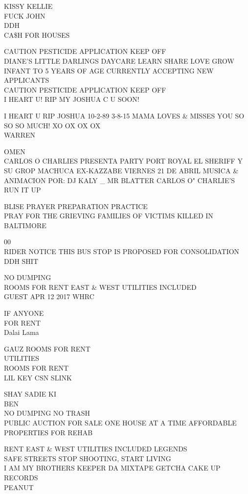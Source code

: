 \documentclass[10pt,letterpaper]{article}
\begin{document}
KISSY KELLIE\\
FUCK JOHN\\
DDH\\
CA\$H FOR HOUSES

CAUTION PESTICIDE APPLICATION KEEP OFF\\
DIANE'S LITTLE DARLINGS DAYCARE LEARN SHARE LOVE GROW INFANT TO 5 YEARS OF AGE CURRENTLY ACCEPTING NEW APPLICANTS\\
CAUTION PESTICIDE APPLICATION KEEP OFF\\
I HEART U!  RIP MY JOSHUA C U SOON!

I HEART U RIP JOSHUA 10{-}2{-}89 3{-}8{-}15 MAMA LOVES \& MISSES YOU SO SO SO MUCH! XO OX OX OX\\
WARREN

OMEN\\
CARLOS O CHARLIES PRESENTA PARTY PORT ROYAL EL SHERIFF Y SU GROP MACHUCA EX{-}KAZZABE VIERNES 21 DE ABRIL MUSICA \& ANIMACION POR: DJ KALY \_ MR BLATTER CARLOS O" CHARLIE'S\\
RUN IT UP

BLISE PRAYER PREPARATION PRACTICE\\
PRAY FOR THE GRIEVING FAMILIES OF VICTIMS KILLED IN BALTIMORE

00\\
RIDER NOTICE THIS BUS STOP IS PROPOSED FOR CONSOLIDATION\\
DDH SHIT

NO DUMPING\\
ROOMS FOR RENT EAST \& WEST UTILITIES INCLUDED\\
GUEST APR 12 2017 WHRC

IF ANYONE\\
FOR RENT\\
Dalai Lama

GAUZ ROOMS FOR RENT\\
UTILITIES\\
ROOMS FOR RENT\\
LIL KEY CSN SLINK

SHAY SADIE KI\\
BEN\\
NO DUMPING NO TRASH\\
PUBLIC AUCTION FOR SALE ONE HOUSE AT A TIME AFFORDABLE PROPERTIES FOR REHAB

RENT EAST \& WEST UTILITIES INCLUDED LEGENDS\\
SAFE STREETS STOP SHOOTING, START LIVING\\
I AM MY BROTHERS KEEPER DA MIXTAPE GETCHA CAKE UP RECORDS\\
PEANUT
\end{document}
